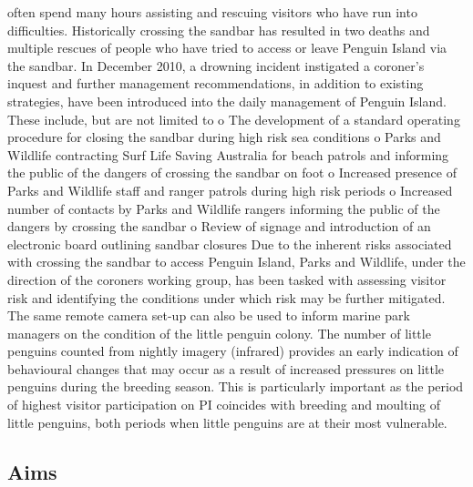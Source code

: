 \documentclass[version=last,
    paper=a4,                               %
    10pt,                                   %
    dvipsnames,
    oneside,                              %
    headings=openany,                       %
    open=any,
    BCOR=7mm,                               %
    DIV=15,     %
]{scrbook}
\begin{document}
often spend many hours assisting and rescuing visitors who have run into
difficulties. Historically crossing the sandbar has resulted in two
deaths and multiple rescues of people who have tried to access or leave
Penguin Island via the sandbar. In December 2010, a drowning incident
instigated a coroner's inquest and further management recommendations,
in addition to existing strategies, have been introduced into the daily
management of Penguin Island. These include, but are not limited to o
The development of a standard operating procedure for closing the
sandbar during high risk sea conditions o Parks and Wildlife contracting
Surf Life Saving Australia for beach patrols and informing the public of
the dangers of crossing the sandbar on foot o Increased presence of
Parks and Wildlife staff and ranger patrols during high risk periods o
Increased number of contacts by Parks and Wildlife rangers informing the
public of the dangers by crossing the sandbar o Review of signage and
introduction of an electronic board outlining sandbar closures Due to
the inherent risks associated with crossing the sandbar to access
Penguin Island, Parks and Wildlife, under the direction of the coroners
working group, has been tasked with assessing visitor risk and
identifying the conditions under which risk may be further mitigated.
The same remote camera set-up can also be used to inform marine park
managers on the condition of the little penguin colony. The number of
little penguins counted from nightly imagery (infrared) provides an
early indication of behavioural changes that may occur as a result of
increased pressures on little penguins during the breeding season. This
is particularly important as the period of highest visitor participation
on PI coincides with breeding and moulting of little penguins, both
periods when little penguins are at their most vulnerable.




\subsection*{Aims}
\end{document}
